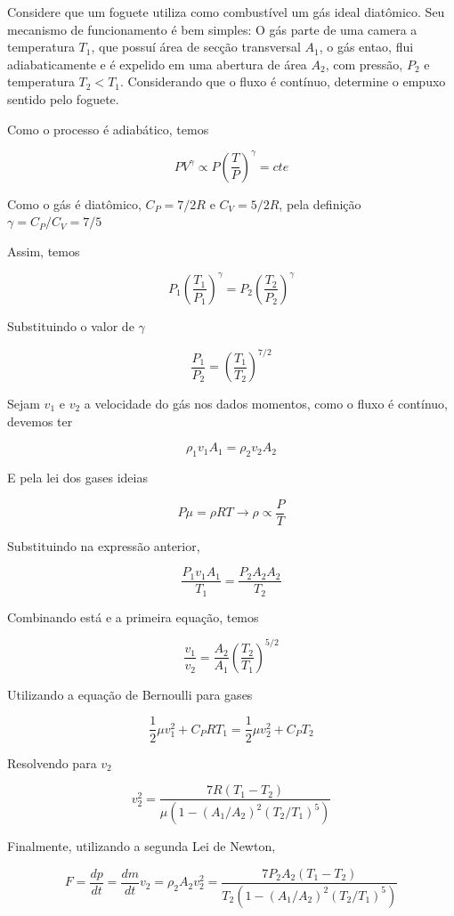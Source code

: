 \documentclass[11pt]{article}
\begin{document}
\begin{pproblem}
    Considere que um foguete utiliza como combustível um gás ideal diatômico. Seu mecanismo de funcionamento é bem simples: O gás parte de uma camera a temperatura \(T_1\), que possuí área de secção transversal \(A_1\), o gás entao, flui adiabaticamente e é expelido em uma abertura de área \(A_2\), com pressão, \(P_2\) e temperatura \(T_2<T_1\). Considerando que o fluxo é contínuo, determine o empuxo sentido pelo foguete.
\begin{pssolution*}{}{}
    Como o processo é adiabático, temos

    \[PV^\gamma \propto P\left(\frac{T}{P}\right)^\gamma = cte\]

    Como o gás é diatômico, \(C_P = 7/2 R\) e \(C_V = 5/2 R\), pela definição \(\gamma = C_P/C_V = 7/5\)

    Assim, temos 

    \[P_1\left(\frac{T_1}{P_1}\right)^\gamma = P_2\left(\frac{T_2}{P_2}\right)^\gamma\]

    Substituindo o valor de \(\gamma\)

    \[\frac{P_1}{P_2} = \left(\frac{T_1}{T_2}\right)^{7/2}\]

    Sejam \(v_1\) e \(v_2\) a velocidade do gás nos dados momentos, como o fluxo é contínuo, devemos ter

    \[\rho_1v_1A_1 = \rho_2v_2A_2\]

    E pela lei dos gases ideias

    \[P\mu = \rho R T \rightarrow \rho \propto \frac{P}{T}\]

    Substituindo na expressão anterior, 

    \[\frac{P_1v_1A_1}{T_1}=\frac{P_2A_2A_2}{T_2}\]

    Combinando está e a primeira equação, temos 
    
    \[\frac{v_1}{v_2} = \frac{A_2}{A_1}\left(\frac{T_2}{T_1}\right)^{5/2}\]

    Utilizando a equação de Bernoulli para gases

    \[\frac{1}{2}\mu v_1^2 + C_P RT_1 = \frac{1}{2}\mu v_2^2 + C_P T_2\]

    Resolvendo para \(v_2\)

    \[v_2^2 = \frac{7R(T_1-T_2)}{\mu(1-(A_1/A_2)^2(T_2/T_1)^5)}\]

    Finalmente, utilizando a segunda Lei de Newton, 

    \[F = \frac{dp}{dt} = \frac{dm}{dt}v_2 = \rho_2A_2 v_2^2 = \boxed{\frac{7P_2A_2(T_1-T_2)}{T_2(1-(A_1/A_2)^2(T_2/T_1)^5)}} \]

\end{pssolution*}

\end{pproblem}
\end{document}
